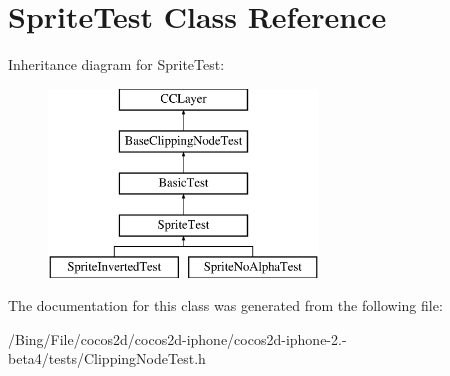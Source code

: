 \hypertarget{interface_sprite_test}{\section{Sprite\-Test Class Reference}
\label{interface_sprite_test}
}
Inheritance diagram for Sprite\-Test\-:\begin{figure}[H]
\begin{center}
\leavevmode
\includegraphics[height=5.000000cm]{interface_sprite_test}
\end{center}
\end{figure}


The documentation for this class was generated from the following file\-:\begin{DoxyCompactItemize}
\item 
/\-Bing/\-File/cocos2d/cocos2d-\/iphone/cocos2d-\/iphone-\/2.-\/beta4/tests/Clipping\-Node\-Test.\-h\end{DoxyCompactItemize}
